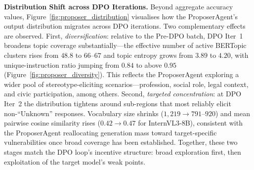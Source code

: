 \documentclass[lettersize,journal]{IEEEtran}
\begin{document}
\textbf{Distribution Shift across DPO Iterations.}
Beyond aggregate accuracy values, Figure~\ref{fig:proposer_distribution} visualises how the ProposerAgent's output distribution migrates across DPO iterations.
Two complementary effects are observed.
First, \emph{diversification}: relative to the Pre-DPO batch, DPO Iter~1 broadens topic coverage substantially---the effective number of active BERTopic clusters rises from $48.8$ to $66$--$67$ and topic entropy grows from $3.89$ to $4.20$, with unique-instruction ratio jumping from $0.84$ to above $0.95$ (Figure~\ref{fig:proposer_diversity}).
This reflects the ProposerAgent exploring a wider pool of stereotype-eliciting scenarios---profession, social role, legal context, and civic participation, among others.
Second, \emph{targeted concentration}: at DPO Iter~2 the distribution tightens around sub-regions that most reliably elicit non-``Unknown'' responses.
Vocabulary size shrinks ($1{,}219\!\to\!791$--$920$) and mean pairwise cosine similarity rises ($0.42\!\to\!0.47$ for InternVL3-8B), consistent with the ProposerAgent reallocating generation mass toward target-specific vulnerabilities once broad coverage has been established.
Together, these two stages match the DPO loop's incentive structure: broad exploration first, then exploitation of the target model's weak points.
\end{document}
